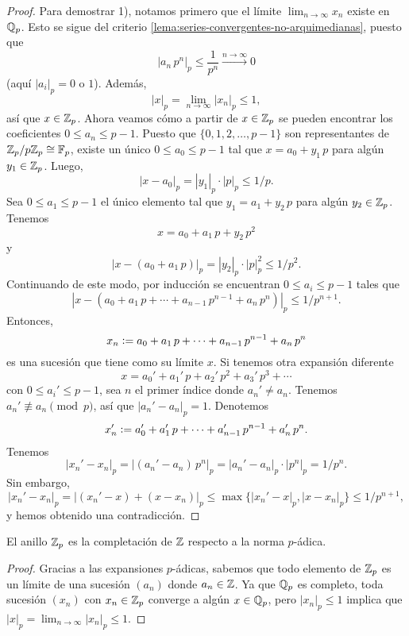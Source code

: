 \documentclass{article}
\numberwithin{equation}{section}
\theoremstyle{definition}
\begin{document}
\begin{teorema}
\begin{proof}
    Para demostrar 1), notamos primero que el límite $\lim_{n\to\infty} x_n$
    existe en $\mathbb{Q}_p$. Esto se sigue del criterio
    \ref{lema:series-convergentes-no-arquimedianas}, puesto que
    $$|a_n\,p^n|_p \le \frac{1}{p^n} \xrightarrow{n\to\infty} 0$$
    (aquí $|a_i|_p = 0 \text{ o } 1$). Además,
    $$|x|_p = \lim_{n\to\infty} |x_n|_p \le 1,$$
    así que $x \in \mathbb{Z}_p$. Ahora veamos cómo a partir de $x \in \mathbb{Z}_p$ se pueden
    encontrar los coeficientes $0 \le a_n \le p-1$. Puesto que
    $\{ 0, 1, 2, \ldots, p-1 \}$ son representantes de
    $\mathbb{Z}_p/p\mathbb{Z}_p \cong \mathbb{F}_p$, existe un único $0 \le a_0 \le p-1$ tal que
    $x = a_0 + y_1\,p$ para algún $y_1 \in \mathbb{Z}_p$. Luego,
    $$|x - a_0|_p = |y_1|_p\cdot|p|_p \le 1/p.$$
    Sea $0 \le a_1 \le p-1$ el único elemento tal que $y_1 = a_1 + y_2\,p$ para
    algún $y_2 \in \mathbb{Z}_p$. Tenemos
    $$x = a_0 + a_1\,p + y_2\,p^2$$
    y
    $$|x - (a_0 + a_1\,p)|_p = |y_2|_p\cdot |p|_p^2 \le 1/p^2.$$
    Continuando de este modo, por inducción se encuentran $0 \le a_i \le p-1$
    tales que
    $$|x - (a_0 + a_1\,p + \cdots + a_{n-1}\,p^{n-1} + a_n\,p^n)|_p \le 1/p^{n+1}.$$
    Entonces,
    $$x_n \mathrel{\mathop:}= a_0 + a_1\,p + \cdots + a_{n-1}\,p^{n-1} + a_n\,p^n$$
    es una sucesión que tiene como su límite $x$. Si tenemos otra expansión
    diferente
    $$x = a_0' + a_1'\,p + a_2'\,p^2 + a_3'\,p^3 + \cdots$$
    con $0 \le a_i' \le p-1$, sea $n$ el primer índice donde
    $a_n' \ne a_n$. Tenemos $a_n' \not\equiv a_n \pmod{p}$, así que
    $|a_n' - a_n|_p = 1$. Denotemos
    $$x_n' \mathrel{\mathop:}= a_0' + a_1'\,p + \cdots + a_{n-1}'\,p^{n-1} + a_n'\,p^n.$$
    Tenemos
    \[ |x_n' - x_n|_p =
       |(a_n' - a_n)\,p^n|_p =
       |a_n'-a_n|_p\cdot |p^n|_p =
       1/p^n. \]
    Sin embargo,
    \[ |x_n' - x_n|_p =
       |(x_n' - x) + (x - x_n)|_p \le
       \max \{ |x_n' - x|_p, |x - x_n|_p \} \le 1/p^{n+1}, \]
    y hemos obtenido una contradicción.
  \end{proof}
\end{teorema}

\begin{corolario}
  El anillo $\mathbb{Z}_p$ es la completación de $\mathbb{Z}$ respecto a la norma $p$-ádica.

  \begin{proof}
    Gracias a las expansiones $p$-ádicas, sabemos que todo elemento de $\mathbb{Z}_p$
    es un límite de una sucesión $(a_n)$ donde $a_n\in \mathbb{Z}$. Ya que $\mathbb{Q}_p$ es
    completo, toda sucesión $(x_n)$ con $x_n\in\mathbb{Z}_p$ converge a algún
    $x\in \mathbb{Q}_p$, pero $|x_n|_p \le 1$ implica que
    $|x|_p = \lim_{n\to\infty} |x_n|_p \le 1$.
  \end{proof}
\end{corolario}
\end{document}
